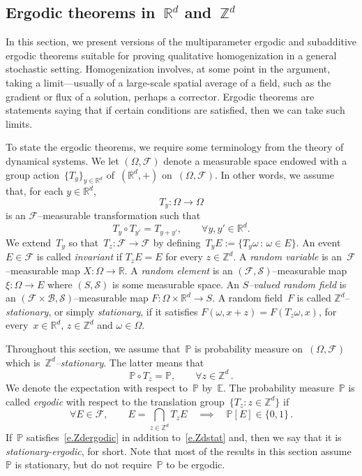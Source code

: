 \documentclass[11pt]{article} %
\numberwithin{equation}{section}
\theoremstyle{definition}
\newcommand*{\R}{\ensuremath{\mathbb{R}}}
\newcommand*{\Zd}{\ensuremath{\mathbb{Z}^d}}
\newcommand*{\Rd}{\ensuremath{\mathbb{R}^d}}
\newcommand{\F}{\mathcal{F}}
\renewcommand{\P}{\mathbb{P}}
\newcommand{\E}{\mathbb{E}}
\begin{document}
\subsection{Ergodic theorems in~\texorpdfstring{$\Rd$}{{Rd}} and~\texorpdfstring{$\Zd$}{{Zd}}}
\label{ss.ergodic}

In this section, we present versions of the multiparameter ergodic and subadditive ergodic theorems suitable for proving qualitative homogenization in a general stochastic setting. Homogenization involves, at some point in the argument, taking a limit---usually of a large-scale spatial average of a field, such as the gradient or flux of a solution, perhaps a corrector. 
Ergodic theorems are statements saying that if certain conditions are satisfied, then we can take such limits. 


\smallskip

To state the ergodic theorems, we require some terminology from the theory of dynamical systems. We let $(\Omega,\F)$ denote a measurable space endowed with a group action~$\{T_y\}_{y\in\Rd}$ of~$(\Rd,+)$ on~$(\Omega,\F)$. In other words, we assume that, for each $y\in\Rd$,
\begin{equation}
T_y:\Omega \to \Omega
\end{equation}
is an $\F$--measurable transformation such that
\begin{equation}
T_y \circ T_{y'} = T_{y+y'}, \qquad \forall y,y'\in\Rd.
\end{equation}
We extend~$T_y$ so that~$T_z :\F \to \F$ by defining~$T_yE := \{ T_y \omega \,:\, \omega \in E \}$. 
An event $E \in \F$ is called \emph{invariant} if $T_z E = E$ for every $z\in\Zd$. 
A \emph{random variable} is an~$\F$--measurable map $X:\Omega \to \R$. A \emph{random element} is an $(\F,\mathcal{S})$--measurable map $\xi : \Omega \to E$ where $(S,\mathcal{S})$ is some measurable space. An \emph{$S$--valued random field} is an $(\F \times \mathcal{B} , \mathcal{S})$--measurable map $F: \Omega \times \Rd \to S$. A random field~$F$ is called $\Zd$--\emph{stationary}, or simply \emph{stationary}, if it satisfies $F(\omega,x+z) = F(T_z\omega,x)$, for every~$x\in\Rd$, $z\in \Zd$ and $\omega\in\Omega$. 

\smallskip

Throughout this section, we assume that~$\P$ is probability measure on~$(\Omega,\F)$ which is~\emph{$\Zd$--stationary}. The latter means that  
\begin{equation}
\label{e.Zdstat}
\P \circ T_z = \P, \qquad \forall z\in\Zd\,.
\end{equation}
We denote the expectation with respect to~$\P$ by~$\E$. 
The probability measure~$\P$ is called \emph{ergodic} with respect to the translation group~$\{T_z : z\in\Zd\}$ if
\begin{equation}
\label{e.Zdergodic}
\forall E \in\F,
\qquad
E = \bigcap_{z\in \Zd} T_z E 
\quad\implies \quad
\P[E] \in \{0,1\}
\,.
\end{equation}
If~$\P$ satisfies~\eqref{e.Zdergodic} in addition to~\eqref{e.Zdstat} and, then we say that it is \emph{stationary-ergodic}, for short. Note that most of the results in this section assume~$\P$ is stationary, but do not require~$\P$ to be ergodic. 
\end{document}
